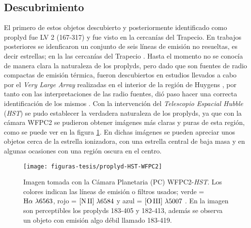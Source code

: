 \subsection{ Descubrimiento}
\label{sec:descubrimiento-proplyds}

El primero de estos objetos descubierto y posteriormente identificado como proplyd fue LV 2 (167-317) y fue visto en la cercanías del Trapecio. En trabajos posteriores se idenficaron un conjunto de seis líneas de emisión no resueltas, es decir estrellas; en la las cercanías del Trapecio \citep{Laques:1979}. Hasta el momento no se conocía de manera clara la naturaleza de los proplyds, pero dado que son fuentes de radio compactas de emisión térmica, fueron descubiertos en estudios llevados a cabo por el \textit{Very Large Array} realizadas en el interior de la región de Huygens \citep{Garay:1987}, por tanto con las interpretaciones de las radio fuentes, dió paso  hacer una correcta identificación de los mismos \citep{Churchwell:1987}. Con la intervención del \textit{Telescopio Espacial Hubble} (\textit{HST}) se pudo establecer la verdadera naturaleza de los proplyds, ya que con la cámara WFPC2 \citep{Odell:1994} se pudieron obtener imágenes más claras y puras de esta región, como se puede ver en la figura \ref{fig:proplyd-hst}. En dichas imágenes se pueden apreciar unos objetos cerca de la estrella ionizadora, con una estrella central de baja masa y en algunas ocasiones con una región oscura en el centro.\\ 

\begin{figure}
  \centering
  \texttt{[image: figuras-tesis/proplyd-HST-WFPC2]}
  \caption{Imagen tomada con la Cámara Planetaria (PC) WFPC2-\textit{HST}. Los colores indican las líneas de emisión o filtros usados;  verde = \(\mathrm{H}\alpha~\lambda6563\), rojo =  \(\mathrm{[N\,II]}~\lambda6584\) y  azul = \(\mathrm{[O\,III]}~\lambda5007\) \citep{Bally:1998a}. En la imagen son perceptibles los proplyds 183-405 y 182-413, además se observa un objeto con emisión algo débil llamado 183-419.}
  \label{fig:proplyd-hst}
\end{figure}
  
